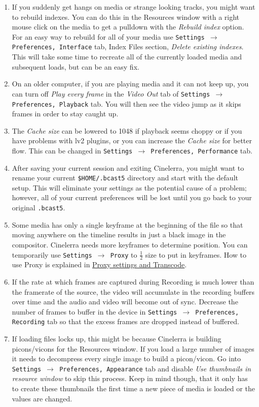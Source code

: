 \begin{enumerate}
	\item If you suddenly get hangs on media or strange looking tracks, you might want to rebuild indexes. You can do this in the Resources window with a right mouse click on the media to get a pulldown with the \textit{Rebuild index} option. For an easy way to rebuild for all of your media use \texttt{Settings $\rightarrow$ Preferences, Interface} tab, Index Files section, \textit{Delete existing indexes}. This will take some time to recreate all of the currently loaded media and subsequent loads, but can be an easy fix.
	\item On an older computer, if you are playing media and it can not keep up, you can turn off \textit{Play every frame} in the \textit{Video Out} tab of \texttt{Settings $\rightarrow$ Preferences, Playback} tab. You will then see the video jump as it skips frames in order to stay caught up.
	\item The \textit{Cache size} can be lowered to 1048 if playback seems choppy or if you have problems with lv2 plugins, or you can increase the \textit{Cache size} for better flow. This can be changed in \texttt{Settings $\rightarrow$ Preferences, Performance} tab.
	\item After saving your current session and exiting Cinelerra, you might want to rename your current \texttt{\$HOME/.bcast5} directory and start with the default setup. This will eliminate your settings as the potential cause of a problem; however, all of your current preferences will be lost until you go back to your original \texttt{.bcast5}.
	\item Some media has only a single keyframe at the beginning of the file so that moving anywhere on the timeline results in just a black image in the compositor. Cinelerra needs more keyframes to determine position. You can temporarily use \texttt{Settings $\rightarrow$ Proxy} to $\frac{1}{2}$ size to put in keyframes. How to use Proxy is explained in \href{sec:proxy_settings}{Proxy settings and Transcode}.
	\item If the rate at which frames are captured during Recording is much lower than the framerate of the source, the video will accumulate in the recording buffers over time and the audio and video will become out of sync. Decrease the number of frames to buffer in the device in \texttt{Settings $\rightarrow $ Preferences, Recording} tab so that the excess frames are dropped instead of buffered.
	\item If loading files locks up, this might be because Cinelerra is building picons/vicons for the Resources window. If you load a large number of images it needs to decompress every single image to build a picon/vicon. Go into \texttt{Settings $\rightarrow$ Preferences, Appearance} tab and disable \textit{Use thumbnails in resource window} to skip this process. Keep in mind though, that it only has to create these thumbnails the first time a new piece of media is loaded or the values are changed.

\end{enumerate}
